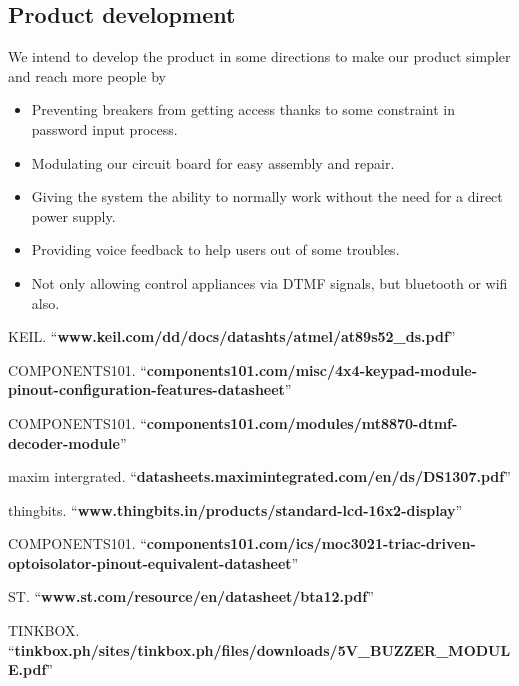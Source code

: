 \documentclass[a4paper]{article}
\begin{document}
\subsection{Product development}
We intend to develop the product in some directions to make our product simpler and reach more people by
\begin{itemize}
    \item Preventing breakers from getting access thanks to some constraint in password input process.
    \item Modulating our circuit board for easy assembly and repair.
    \item Giving the system the ability to normally work without the need for a direct power supply.
    \item Providing voice feedback to help users out of some troubles.
    \item Not only allowing control appliances via DTMF signals, but bluetooth or wifi also.
\end{itemize}
\newpage
\begin{thebibliography}{80}


 KEIL.
``\textbf{www.keil.com/dd/docs/datashts/atmel/at89s52\_ds.pdf}''

 COMPONENTS101.
``\textbf{components101.com/misc/4x4-keypad-module-pinout-configuration-features-datasheet}''

 COMPONENTS101.
``\textbf{components101.com/modules/mt8870-dtmf-decoder-module}''

 maxim intergrated.
``\textbf{datasheets.maximintegrated.com/en/ds/DS1307.pdf}''

 thingbits.
``\textbf{www.thingbits.in/products/standard-lcd-16x2-display}''

 COMPONENTS101.
``\textbf{components101.com/ics/moc3021-triac-driven-optoisolator-pinout-equivalent-datasheet}''

 ST.
``\textbf{www.st.com/resource/en/datasheet/bta12.pdf}''

 TINKBOX.
``\textbf{tinkbox.ph/sites/tinkbox.ph/files/downloads/5V\_BUZZER\_MODULE.pdf}''

\end{thebibliography}
\end{document}
